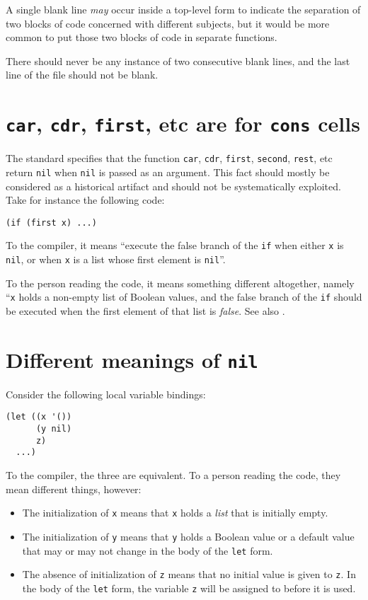 A single blank line \emph{may} occur inside a top-level form to
indicate the separation of two blocks of code concerned with different
subjects, but it would be more common to put those two blocks of code
in separate functions.

There should never be any instance of two consecutive blank lines, and
the last line of the file should not be blank.

\section{\texttt{car}, \texttt{cdr}, \texttt{first}, etc are for
  \texttt{cons} cells}

The \commonlisp{} standard specifies that the function \texttt{car},
\texttt{cdr}, \texttt{first}, \texttt{second}, \texttt{rest}, etc
return \texttt{nil} when \texttt{nil} is passed as an argument.  This
fact should mostly be considered as a historical artifact and should
not be systematically exploited.  Take for instance the following
code:

\begin{verbatim}
(if (first x) ...)
\end{verbatim}

To the compiler, it means ``execute the false branch of the \texttt{if}
when either \texttt{x} is \texttt{nil}, or when \texttt{x} is a list
whose first element is \texttt{nil}''.

To the person reading the code, it means something different
altogether, namely ``\texttt{x} holds a non-empty list of Boolean
values, and the false branch of the \texttt{if} should be executed
when the first element of that list is
\emph{false}. See also .

\section{Different meanings of \texttt{nil}}
\label{sec-coding-style-meanings-of-nil}

Consider the following local variable bindings:

\begin{verbatim}
(let ((x '())
      (y nil)
      z)
  ...)
\end{verbatim}

To the compiler, the three are equivalent.  To a person reading the
code, they mean different things, however:

\begin{itemize}
\item The initialization of \texttt{x} means that \texttt{x} holds a
  \emph{list} that is initially empty.
\item The initialization of \texttt{y} means that \texttt{y} holds a
  Boolean value or a default value that may or may not change in the
  body of the \texttt{let} form.
\item The absence of initialization of \texttt{z} means that no
  initial value is given to \texttt{z}.  In the body of the
  \texttt{let} form, the variable \texttt{z} will be assigned to
  before it is used.
\end{itemize}

